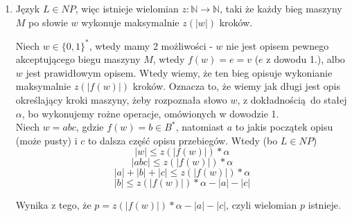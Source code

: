 \documentclass[a4paper]{article}
\renewcommand\qedsymbol{\scalebox{0.75}{$\blacksquare$}}%
\newcommand{\N}{\mathbb N}%
\newcommand{\set}[1]{\{#1\}}%
\newcommand{\from}{\colon}%
\begin{document}
\begin{enumerate}
  \item
  Język $L \in NP$, więc istnieje wielomian $z \from \N \to \N$, taki że każdy bieg maszyny $M$ po słowie $w$ wykonuje maksymalnie $z(|w|)$ kroków.

  Niech $w \in \set{0, 1}^{*}$, wtedy mamy 2 możliwości - $w$ nie jest opisem pewnego akceptującego biegu maszyny $M$, wtedy $f(w) = e = v$ ($e$ z dowodu 1.), albo $w$ jest prawidłowym opisem. Wtedy wiemy, że ten bieg opisuje wykonianie maksymalnie $z(|f(w)|)$ kroków. Oznacza to, że wiemy jak długi jest opis określający kroki maszyny, żeby rozpoznała słowo $w$, z dokładnością do stałej $\alpha$, bo wykonujemy rożne operacje, omówionych w dowodzie 1. \\
  Niech $w = abc$, gdzie $f(w) = b \in B^{*}$, natomiast $a$ to jakis początek opisu (może pusty) i $c$ to dalsza część opisu przebiegów. Wtedy (bo $L \in NP$)
  $$|w| \leq z(|f(w)|) * \alpha$$
  $$|abc| \leq z(|f(w)|) * \alpha$$
  $$|a| + |b| + |c| \leq z(|f(w)|) * \alpha$$
  $$|b| \leq z(|f(w)|) * \alpha - |a| - |c|$$

  Wynika z tego, że $p = z(|f(w)|) * \alpha - |a| - |c|$, czyli wielomian $p$ istnieje.

\end{enumerate}

\qedsymbol
\end{document}

